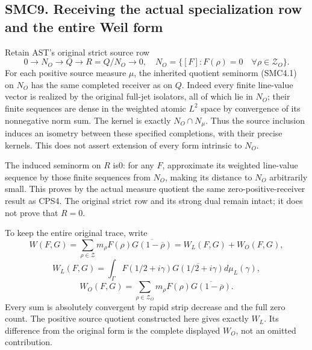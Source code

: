 \subsection{SMC9. Receiving the actual specialization row and the entire
Weil
form}\label{smc9.-receiving-the-actual-specialization-row-and-the-entire-weil-form}

Retain AST's original strict source row \[
0\longrightarrow N_O\longrightarrow Q\longrightarrow R=Q/N_O\longrightarrow0,
\quad N_O=\{[F]:F(\rho)=0\quad\forall\rho\in\mathscr Z_O\}.
\tag{SMC9.1}
\] For each positive source measure \(\mu\), the inherited quotient
seminorm (SMC4.1) on \(N_O\) has the same completed receiver as on
\(Q\). Indeed every finite line-value vector is realized by the original
full-jet isolators, all of which lie in \(N_O\); their finite sequences
are dense in the weighted atomic \(L^2\) space by convergence of its
nonnegative norm sum. The kernel is exactly \(N_O\cap N_\mu\). Thus the
source inclusion induces an isometry between these specified
completions, with their precise kernels. This does not assert extension
of every form intrinsic to \(N_O\).

The induced seminorm on \(R\) is0: for any \(F\), approximate its
weighted line-value sequence by those finite sequences from \(N_O\),
making its distance to \(N_O\) arbitrarily small. This proves by the
actual measure quotient the same zero-positive-receiver result as CPS4.
The original strict row and its strong dual remain intact; it does not
prove that \(R=0\).

To keep the entire original trace, write \[
W(F,G)=\sum_{\rho\in\mathscr Z}m_\rho F(\rho)\overline{G(1-\overline\rho)}
=W_L(F,G)+W_O(F,G),
\] \[
W_L(F,G)=\int_\Gamma F(1/2+i\gamma)\overline{G(1/2+i\gamma)}d\mu_L(\gamma),
\] \[
W_O(F,G)=\sum_{\rho\in\mathscr Z_O}m_\rho F(\rho)\overline{G(1-\overline\rho)}.
\tag{SMC9.2}
\] Every sum is absolutely convergent by rapid strip decrease and the
full zero count. The positive source quotient constructed here gives
exactly \(W_L\). Its difference from the original form is the complete
displayed \(W_O\), not an omitted contribution.

